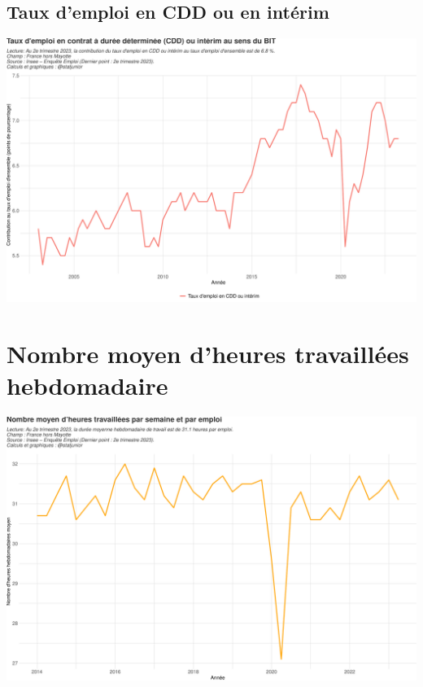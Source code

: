 \documentclass[
  paper=a4,
  ,captions=tableheading
]{scrartcl}
\begin{document}
\hypertarget{taux-demploi-en-cdd-ou-en-intuxe9rim}{%
\subsection{Taux d'emploi en CDD ou en
intérim}\label{taux-demploi-en-cdd-ou-en-intuxe9rim}}

\includegraphics{rapport_activite_emploi_chomage_insee_files/figure-latex/unnamed-chunk-13-1.pdf}

\hypertarget{nombre-moyen-dheures-travailluxe9es-hebdomadaire}{%
\section{Nombre moyen d'heures travaillées
hebdomadaire}\label{nombre-moyen-dheures-travailluxe9es-hebdomadaire}}

\includegraphics{rapport_activite_emploi_chomage_insee_files/figure-latex/unnamed-chunk-15-1.pdf}
\end{document}
